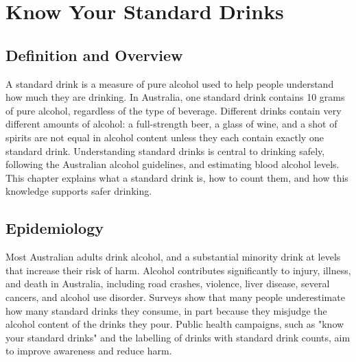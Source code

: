 \chapter{Know Your Standard Drinks}

\section*{Definition and Overview}
A standard drink is a measure of pure alcohol used to help people understand how much they are drinking. In Australia, one standard drink contains 10 grams of pure alcohol, regardless of the type of beverage. Different drinks contain very different amounts of alcohol: a full-strength beer, a glass of wine, and a shot of spirits are not equal in alcohol content unless they each contain exactly one standard drink. Understanding standard drinks is central to drinking safely, following the Australian alcohol guidelines, and estimating blood alcohol levels. This chapter explains what a standard drink is, how to count them, and how this knowledge supports safer drinking.

\section*{Epidemiology}
Most Australian adults drink alcohol, and a substantial minority drink at levels that increase their risk of harm. Alcohol contributes significantly to injury, illness, and death in Australia, including road crashes, violence, liver disease, several cancers, and alcohol use disorder. Surveys show that many people underestimate how many standard drinks they consume, in part because they misjudge the alcohol content of the drinks they pour. Public health campaigns, such as "know your standard drinks" and the labelling of drinks with standard drink counts, aim to improve awareness and reduce harm.

